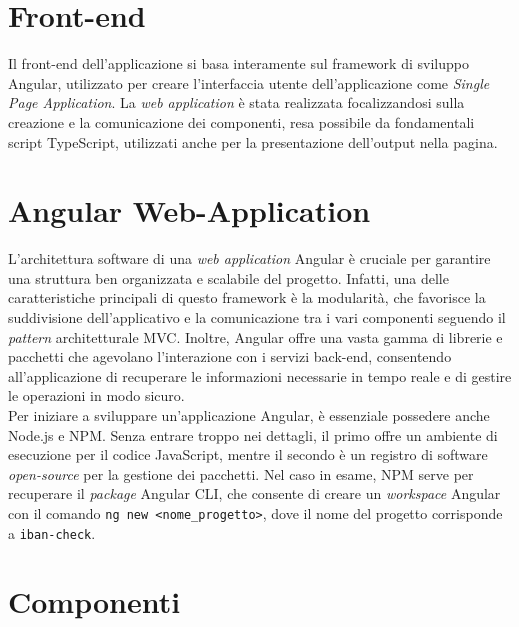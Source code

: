 \section{Front-end}

Il front-end dell’applicazione si basa interamente sul framework di sviluppo Angular, utilizzato per creare l’interfaccia utente dell’applicazione come \textit{Single Page Application}. La \textit{web application} è stata realizzata focalizzandosi sulla creazione e la comunicazione dei componenti, resa possibile da fondamentali script TypeScript, utilizzati anche per la presentazione dell’output nella pagina.

\section{Angular Web-Application}
L’architettura software di una \textit{web application} Angular è cruciale per garantire una struttura ben organizzata e scalabile del progetto. Infatti, una delle caratteristiche principali di questo framework è la modularità, che favorisce la suddivisione dell’applicativo e la comunicazione tra i vari componenti seguendo il \textit{pattern} architetturale MVC. Inoltre, Angular offre una vasta gamma di librerie e pacchetti che agevolano l’interazione con i servizi back-end, consentendo all’applicazione di recuperare le informazioni necessarie in tempo reale e di gestire le operazioni in modo sicuro.\\
Per iniziare a sviluppare un'applicazione Angular, è essenziale possedere anche Node.js e NPM. Senza entrare troppo nei dettagli, il primo offre un ambiente di esecuzione per il codice JavaScript, mentre il secondo è un registro di software \textit{open-source} per la gestione dei pacchetti. Nel caso in esame, NPM serve per recuperare il \textit{package} Angular CLI, che consente di creare un \textit{workspace} Angular con il comando \texttt{ng new <nome\_progetto>}, dove il nome del progetto corrisponde a \texttt{iban-check}.

\section{Componenti}

